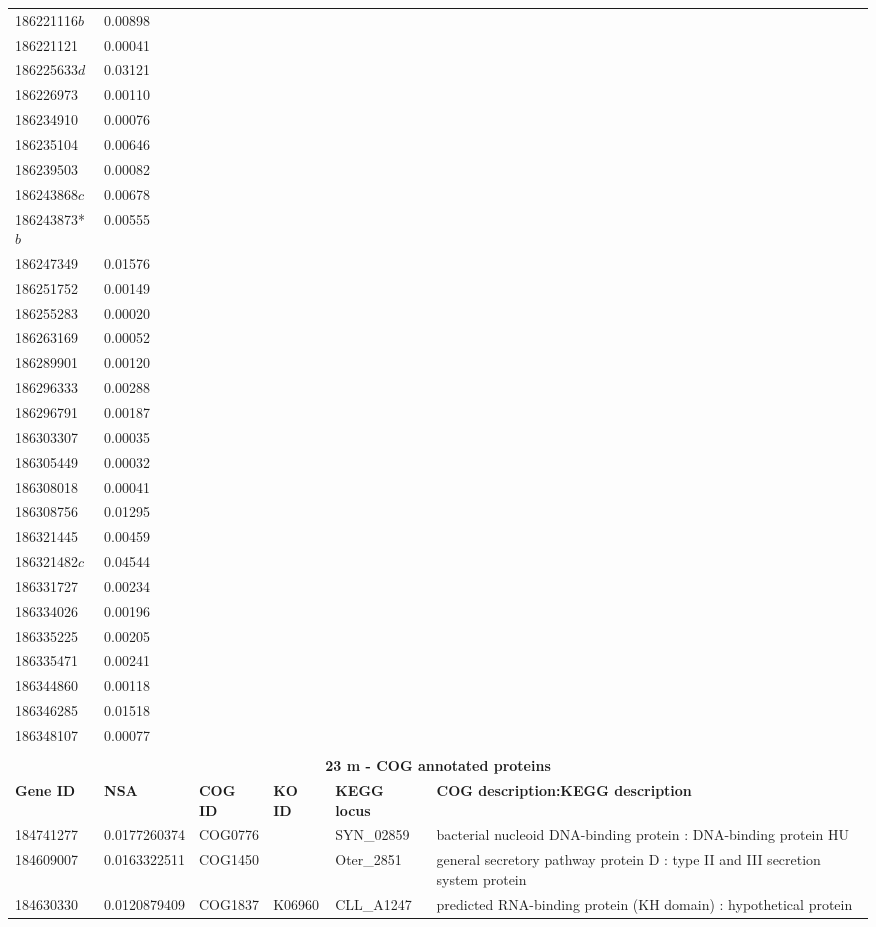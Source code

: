 \begin{landscape}
\begin{longtable}{p{1.6cm}p{1.2cm}p{1.5cm}p{1.5cm}p{2.8cm}p{13.5cm}}
186221116$b$&0.00898&&&& \\
186221121&0.00041&&&& \\
186225633$d$&0.03121&&&& \\
186226973&0.00110&&&& \\
186234910&0.00076&&&& \\
186235104&0.00646&&&& \\
186239503&0.00082&&&& \\
186243868$c$&0.00678&&&& \\
186243873*$b$&0.00555&&&& \\
186247349&0.01576&&&& \\
186251752&0.00149&&&& \\
186255283&0.00020&&&& \\
186263169&0.00052&&&& \\
186289901&0.00120&&&& \\
186296333&0.00288&&&& \\
186296791&0.00187&&&& \\
186303307&0.00035&&&& \\
186305449&0.00032&&&& \\
186308018&0.00041&&&& \\
186308756&0.01295&&&& \\
186321445&0.00459&&&& \\
186321482$c$&0.04544&&&& \\
186331727&0.00234&&&& \\
186334026&0.00196&&&& \\
186335225&0.00205&&&& \\
186335471&0.00241&&&& \\
186344860&0.00118&&&& \\
186346285&0.01518&&&& \\
186348107&0.00077&&&& \\
&&&&& \\
\multicolumn{6}{c}{\textbf{23 m - COG annotated proteins}} \\
\textbf{Gene ID} & \textbf{NSA} & \textbf{COG ID} & \textbf{KO ID} & \textbf{KEGG locus} & \textbf{COG description:KEGG description} \\
184741277&0.0177260374&COG0776&&SYN\_02859&bacterial nucleoid DNA-binding protein : DNA-binding protein HU \\
184609007&0.0163322511&COG1450&&Oter\_2851&general secretory pathway protein D : type II and III secretion system protein \\
184630330&0.0120879409&COG1837&K06960&CLL\_A1247&predicted RNA-binding protein (KH domain) : hypothetical protein \\

\end{longtable}
\end{landscape}
